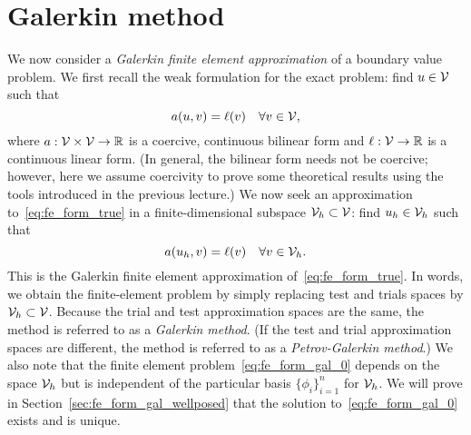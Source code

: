 \section{Galerkin method}
We now consider a \emph{Galerkin finite element approximation} of a boundary value problem.  We first recall the weak formulation for the exact problem: find $u \in \mathcal{V}$ such that
\begin{equation}
  a(u,v) = \ell(v) \quad \forall v \in \mathcal{V},
  \label{eq:fe_form_true}
\end{equation}
where $a: \mathcal{V} \times \mathcal{V} \to \mathbb{R}$ is a coercive, continuous bilinear form and $\ell: \mathcal{V} \to \mathbb{R}$ is a continuous linear form.  (In general, the bilinear form needs not be coercive; however, here we assume coercivity to prove some theoretical results using the tools introduced in the previous lecture.) We now seek an approximation to~\eqref{eq:fe_form_true} in a finite-dimensional subspace $\mathcal{V}_h \subset \mathcal{V}$: find $u_h \in \mathcal{V}_h$ such that
\begin{equation}
  a(u_h,v) = \ell(v) \quad \forall v \in \mathcal{V}_h.
  \label{eq:fe_form_gal_0}
\end{equation}
This is the Galerkin finite element approximation of~\eqref{eq:fe_form_true}. In words, we obtain the finite-element problem by simply replacing test and trials spaces by $\mathcal{V}_h \subset \mathcal{V}$.  Because the trial and test approximation spaces are the same, the method is referred to as a \emph{Galerkin method}.  (If the test and trial approximation spaces are different, the method is referred to as a \emph{Petrov-Galerkin method}.) We also note that the finite element problem~\eqref{eq:fe_form_gal_0} depends on the space $\mathcal{V}_h$ but is independent of the particular basis $\{ \phi_i \}_{i=1}^n$ for $\mathcal{V}_h$.  We will prove in Section~\ref{sec:fe_form_gal_wellposed} that the solution to~\eqref{eq:fe_form_gal_0} exists and is unique.

